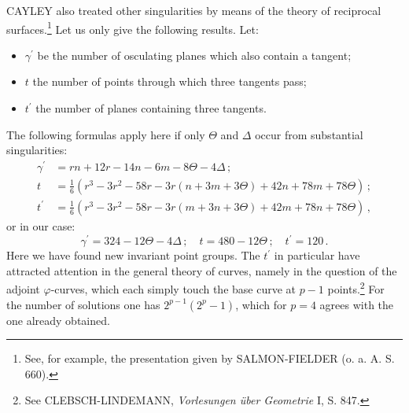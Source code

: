 \documentclass[leqno]{article}
\begin{document}
CAYLEY also treated other singularities by means of the theory of reciprocal surfaces.\footnote{See, for example, the presentation given by SALMON-FIELDER (o. a. A. S. 660).} Let us only give the following results. Let:
\begin{itemize}[label={}]
	\item $ \gamma^\prime $ be the number of osculating planes which also contain a tangent;
	\item $ t $ the number of points through which three tangents pass;
	\item $ t^\prime $ the number of planes containing three tangents.
\end{itemize}
The following formulas apply here if only $ \Theta $ and $ \Delta$ occur from substantial singularities:
\begin{align*}
	\gamma^\prime &= rn + 12r - 14n - 6m - 8\Theta - 4\Delta  \, ; \\
	t &= \frac{1}{6}\left(r^3 - 3r^2 - 58r - 3r \left(n + 3m + 3\Theta \right) +42n + 78m + 78\Theta \right) \, ; \\
	t^\prime &= \frac{1}{6} \left(r^3 - 3r^2 - 58r - 3r \left(m + 3n + 3\Theta \right)+42m + 78n + 78\Theta\right) \, , 
\end{align*}
or in our case:
\[
\gamma^\prime = 324 - 12\Theta - 4\Delta \, ; \quad t=480-12\Theta \, ; \quad t^\prime = 120 \, . 
\]
Here we have found new invariant point groups. The $ t^\prime $ in particular have attracted attention in the general theory of curves, namely in the question of the adjoint $ \varphi$-curves, which each simply touch the base curve at $ p-1 $ points.\footnote{See CLEBSCH-LINDEMANN, \textit{Vorlesungen \"uber Geometrie} I, S. 847.} For the number of solutions one has $ 2^{p-1} (2^p-1) $, which for $ p = 4 $ agrees with the one already obtained.
\end{document}
